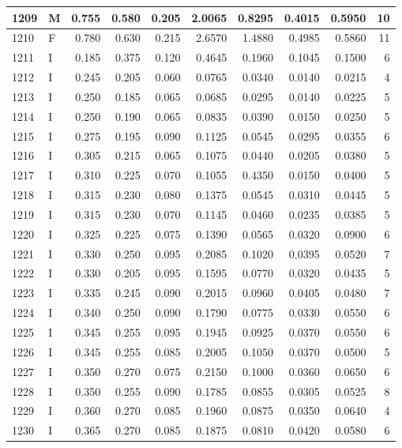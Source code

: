 \documentclass[9pt,twocolumn,twoside,]{pnas-new}
\begin{document}
\begin{tabular}{l|l|r|r|r|r|r|r|r|r}
\hline
1209 & M & 0.755 & 0.580 & 0.205 & 2.0065 & 0.8295 & 0.4015 & 0.5950 & 10\\
\hline
1210 & F & 0.780 & 0.630 & 0.215 & 2.6570 & 1.4880 & 0.4985 & 0.5860 & 11\\
\hline
1211 & I & 0.185 & 0.375 & 0.120 & 0.4645 & 0.1960 & 0.1045 & 0.1500 & 6\\
\hline
1212 & I & 0.245 & 0.205 & 0.060 & 0.0765 & 0.0340 & 0.0140 & 0.0215 & 4\\
\hline
1213 & I & 0.250 & 0.185 & 0.065 & 0.0685 & 0.0295 & 0.0140 & 0.0225 & 5\\
\hline
1214 & I & 0.250 & 0.190 & 0.065 & 0.0835 & 0.0390 & 0.0150 & 0.0250 & 5\\
\hline
1215 & I & 0.275 & 0.195 & 0.090 & 0.1125 & 0.0545 & 0.0295 & 0.0355 & 6\\
\hline
1216 & I & 0.305 & 0.215 & 0.065 & 0.1075 & 0.0440 & 0.0205 & 0.0380 & 5\\
\hline
1217 & I & 0.310 & 0.225 & 0.070 & 0.1055 & 0.4350 & 0.0150 & 0.0400 & 5\\
\hline
1218 & I & 0.315 & 0.230 & 0.080 & 0.1375 & 0.0545 & 0.0310 & 0.0445 & 5\\
\hline
1219 & I & 0.315 & 0.230 & 0.070 & 0.1145 & 0.0460 & 0.0235 & 0.0385 & 5\\
\hline
1220 & I & 0.325 & 0.225 & 0.075 & 0.1390 & 0.0565 & 0.0320 & 0.0900 & 6\\
\hline
1221 & I & 0.330 & 0.250 & 0.095 & 0.2085 & 0.1020 & 0.0395 & 0.0520 & 7\\
\hline
1222 & I & 0.330 & 0.205 & 0.095 & 0.1595 & 0.0770 & 0.0320 & 0.0435 & 5\\
\hline
1223 & I & 0.335 & 0.245 & 0.090 & 0.2015 & 0.0960 & 0.0405 & 0.0480 & 7\\
\hline
1224 & I & 0.340 & 0.250 & 0.090 & 0.1790 & 0.0775 & 0.0330 & 0.0550 & 6\\
\hline
1225 & I & 0.345 & 0.255 & 0.095 & 0.1945 & 0.0925 & 0.0370 & 0.0550 & 6\\
\hline
1226 & I & 0.345 & 0.255 & 0.085 & 0.2005 & 0.1050 & 0.0370 & 0.0500 & 5\\
\hline
1227 & I & 0.350 & 0.270 & 0.075 & 0.2150 & 0.1000 & 0.0360 & 0.0650 & 6\\
\hline
1228 & I & 0.350 & 0.255 & 0.090 & 0.1785 & 0.0855 & 0.0305 & 0.0525 & 8\\
\hline
1229 & I & 0.360 & 0.270 & 0.085 & 0.1960 & 0.0875 & 0.0350 & 0.0640 & 4\\
\hline
1230 & I & 0.365 & 0.270 & 0.085 & 0.1875 & 0.0810 & 0.0420 & 0.0580 & 6\\

\end{tabular}
\end{document}
